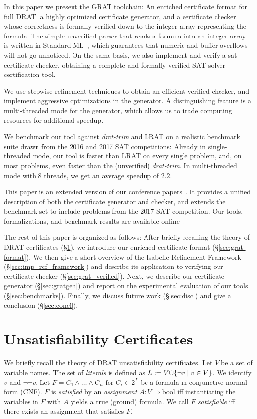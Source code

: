 \documentclass[smallcondensed]{svjour3}     %
\begin{document}
In this paper we present the GRAT toolchain:
An enriched certificate format for full DRAT, a highly optimized certificate generator, and a certificate checker whose correctness
is formally verified down to the integer array representing the formula. 
The simple unverified parser that reads a formula into an integer array is written in Standard ML~\cite{MHMT97}, which guarantees that numeric and buffer overflows will not go unnoticed. 
On the same basis, we also implement and verify a sat certificate checker, obtaining a complete and formally verified SAT solver certification tool.

We use stepwise refinement techniques to obtain an efficient verified checker, and implement aggressive optimizations in the generator.
A distinguishing feature is a multi-threaded mode for the generator, which allows us to trade computing resources for additional speedup.

We benchmark our tool against {\sl drat-trim} and LRAT on a realistic benchmark suite drawn from the 2016 and 2017 SAT 
competitions: Already in single-threaded mode, our tool is faster than LRAT on every single problem, and, on most problems, even faster than the (unverified) {\sl drat-trim}.
In multi-threaded mode with 8 threads, we get an average speedup of $2.2$.

This paper is an extended version of our conference papers~\cite{La17_CADE,La17_SAT}. It provides a unified description of 
both the certificate generator and checker, and extends the benchmark set to include problems from the 2017 SAT competition.
Our tools, formalizations, and benchmark results are available online~\cite{GRAT-homepage}.


The rest of this paper is organized as follows: 
After briefly recalling the theory of DRAT certificates (\S\ref{sec:unsat_cert}), we introduce our enriched certificate format (\S\ref{sec:grat-format}).
We then give a short overview of the Isabelle Refinement Framework (\S\ref{sec:imp_ref_framework})
and describe its application to verifying our certificate checker (\S\ref{sec:grat_verified}). 
Next, we describe our certificate generator (\S\ref{sec:gratgen}) and report on the experimental evaluation 
of our tools (\S\ref{sec:benchmarks}).
Finally, we discuss future work (\S\ref{sec:disc}) and give a conclusion (\S\ref{sec:concl}).


\section{Unsatisfiability Certificates}\label{sec:unsat_cert}
We briefly recall the theory of DRAT unsatisfiability certificates. 
Let $V$ be a set of variable names. The set of \emph{literals} is defined as $L := V \dot{\cup} \{\neg v \mid v\in V \}$.
We identify $v$ and $\neg\neg v$.
Let $F = C_1 \wedge \ldots \wedge C_n$ for $C_i \in 2^L$ be a formula in conjunctive normal form (CNF). 
$F$ is \emph{satisfied} by an \emph{assignment} $A : V \Rightarrow \textrm{bool}$ iff instantiating the variables in $F$ with $A$ yields a true (ground) formula.
We call $F$ \emph{satisfiable} iff there exists an assignment that satisfies $F$.
\end{document}

